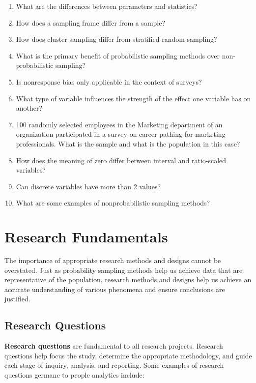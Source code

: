 \documentclass[
]{book}
\begin{document}
\begin{enumerate}
\def\labelenumi{\arabic{enumi}.}
\item
  What are the differences between parameters and statistics?
\item
  How does a sampling frame differ from a sample?
\item
  How does cluster sampling differ from stratified random sampling?
\item
  What is the primary benefit of probabilistic sampling methods over non-probabilistic sampling?
\item
  Is nonresponse bias only applicable in the context of surveys?
\item
  What type of variable influences the strength of the effect one variable has on another?
\item
  100 randomly selected employees in the Marketing department of an organization participated in a survey on career pathing for marketing professionals. What is the sample and what is the population in this case?
\item
  How does the meaning of zero differ between interval and ratio-scaled variables?
\item
  Can discrete variables have more than 2 values?
\item
  What are some examples of nonprobabilistic sampling methods?
\end{enumerate}

\hypertarget{research}{%
\chapter{Research Fundamentals}\label{research}}

The importance of appropriate research methods and designs cannot be overstated. Just as probability sampling methods help us achieve data that are representative of the population, research methods and designs help us achieve an accurate understanding of various phenomena and ensure conclusions are justified.

\hypertarget{research-questions}{%
\section{Research Questions}\label{research-questions}}

\textbf{Research questions} are fundamental to all research projects. Research questions help focus the study, determine the appropriate methodology, and guide each stage of inquiry, analysis, and reporting. Some examples of research questions germane to people analytics include:
\end{document}
